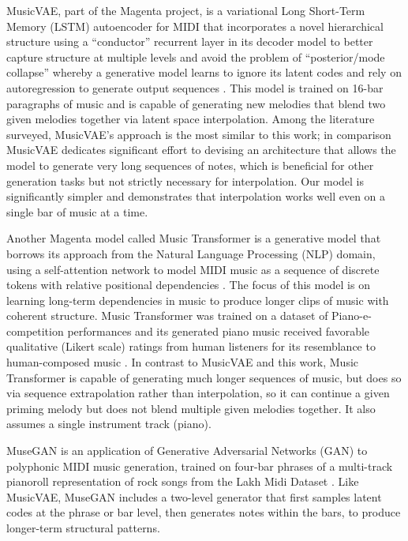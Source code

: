 \documentclass[sigconf,authorversion]{acmart}
\begin{document}
MusicVAE, part of the Magenta project, is a variational Long
Short-Term Memory (LSTM) autoencoder for MIDI that incorporates a
novel hierarchical structure using a ``conductor'' recurrent layer in
its decoder model to better capture structure at multiple levels and
avoid the problem of ``posterior/mode collapse'' whereby a generative
model learns to ignore its latent codes and rely on autoregression to
generate output sequences \cite{roberts_hierarchical_2018}. This model
is trained on 16-bar paragraphs of music and is capable of generating
new melodies that blend two given melodies together via latent space
interpolation. Among the literature surveyed, MusicVAE's approach is
the most similar to this work; in comparison MusicVAE dedicates
significant effort to devising an architecture that allows the model
to generate very long sequences of notes, which is beneficial for
other generation tasks but not strictly necessary for
interpolation. Our model is significantly simpler and demonstrates
that interpolation works well even on a single bar of music at a time.

Another Magenta model called Music Transformer is a generative model
that borrows its approach from the Natural Language Processing (NLP)
domain, using a self-attention network to model MIDI music as a
sequence of discrete tokens with relative positional dependencies
\cite{huang_music_2018}. The focus of this model is on learning
long-term dependencies in music to produce longer clips of music with
coherent structure. Music Transformer was trained on a dataset of
Piano-e-competition performances \cite{hawthorne2019enabling} and its
generated piano music received favorable qualitative (Likert scale)
ratings from human listeners for its resemblance to human-composed
music \cite{huang_music_2018}. In contrast to MusicVAE and this work,
Music Transformer is capable of generating much longer sequences of
music, but does so via sequence extrapolation rather than
interpolation, so it can continue a given priming melody but does not
blend multiple given melodies together. It also assumes a single
instrument track (piano).

MuseGAN \cite{dong2017musegan} is an application of Generative
Adversarial Networks (GAN) to polyphonic MIDI music generation,
trained on four-bar phrases of a multi-track pianoroll representation
of rock songs from the Lakh Midi Dataset
\cite{raffel_learning-based_2016}. Like MusicVAE, MuseGAN includes a
two-level generator that first samples latent codes at the phrase or
bar level, then generates notes within the bars, to produce
longer-term structural patterns.
\end{document}
